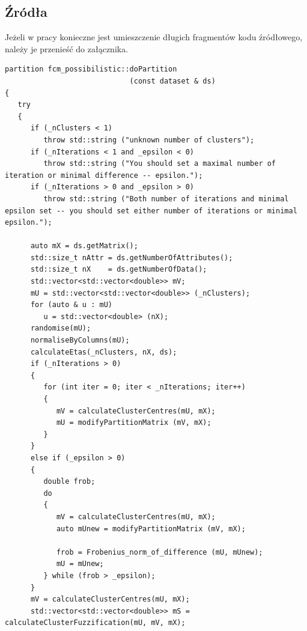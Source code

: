 \documentclass[a4paper,twoside,12pt]{book}
\begin{document}
\begin{appendices}
\chapter*{Źródła}

Jeżeli w pracy konieczne jest umieszczenie długich fragmentów kodu źródłowego, należy je przenieść do załącznika.

\begin{lstlisting}
partition fcm_possibilistic::doPartition
                             (const dataset & ds)
{
   try
   {
      if (_nClusters < 1)
         throw std::string ("unknown number of clusters");
      if (_nIterations < 1 and _epsilon < 0)
         throw std::string ("You should set a maximal number of iteration or minimal difference -- epsilon.");
      if (_nIterations > 0 and _epsilon > 0)
         throw std::string ("Both number of iterations and minimal epsilon set -- you should set either number of iterations or minimal epsilon.");
   
      auto mX = ds.getMatrix();
      std::size_t nAttr = ds.getNumberOfAttributes();
      std::size_t nX    = ds.getNumberOfData();
      std::vector<std::vector<double>> mV;
      mU = std::vector<std::vector<double>> (_nClusters);
      for (auto & u : mU)
         u = std::vector<double> (nX);
      randomise(mU);
      normaliseByColumns(mU);
      calculateEtas(_nClusters, nX, ds);
      if (_nIterations > 0)
      {
         for (int iter = 0; iter < _nIterations; iter++)
         {
            mV = calculateClusterCentres(mU, mX);
            mU = modifyPartitionMatrix (mV, mX);
         }
      }
      else if (_epsilon > 0)
      {
         double frob;
         do 
         {
            mV = calculateClusterCentres(mU, mX);
            auto mUnew = modifyPartitionMatrix (mV, mX);
            
            frob = Frobenius_norm_of_difference (mU, mUnew);
            mU = mUnew;
         } while (frob > _epsilon);
      }
      mV = calculateClusterCentres(mU, mX);
      std::vector<std::vector<double>> mS = calculateClusterFuzzification(mU, mV, mX);
      

\end{lstlisting}
\end{appendices}
\end{document}
